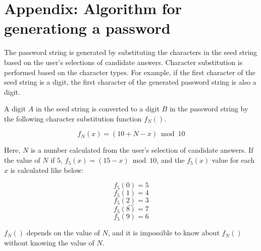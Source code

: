 \documentclass{sigchi}
\begin{document}
{%


}

\section*{Appendix: Algorithm for generationg a password}



The password string is generated by
substituting the characters in the seed string
based on the user's selections of candidate answers.
Character substitution is performed based on the character types.
For example, if the first character of the seed string is a digit,
the first character of the generated password string is also a digit.


A digit $A$ in the seed string is converted to a digit $B$
in the password string by the following
character substitution function $f_N()$.

\[ f_N(x) = (10 + N - x) \bmod 10 \]


Here, $N$ is a number calculated from the user's selection of
candidate answers.
If the value of $N$ if $5$, $f_5(x) = (15-x) \bmod 10$, and
the $f_5(x)$ value for each $x$ is calculated like below:

\[ f_5(0) = 5 \]
\[ f_5(1) = 4 \]
\[ f_5(2) = 3 \]
\[ ... \]
\[ f_5(8) = 7 \]
\[ f_5(9) = 6 \]


$f_N()$ depends on the value of $N$, and
it is impossible to know about $f_N()$ without knowing the value of $N$.
 
\end{document}
